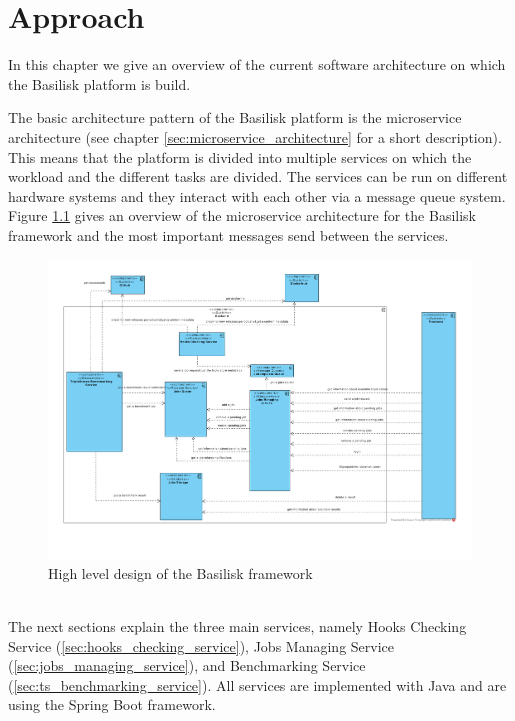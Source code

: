 \chapter{Approach}
\label{ch:approach}

In this chapter we give an overview of the current software architecture on which the Basilisk platform is build.

The basic architecture pattern of the Basilisk platform is the microservice architecture (see chapter \ref{sec:microservice_architecture} for a short description). 
This means that the platform is divided into multiple services on which the workload and the different tasks are divided.
The services can be run on different hardware systems and they interact with each other via a message queue system.
\\


Figure \ref{fig:basilisk_high_level_design} gives an overview of the microservice architecture for the Basilisk framework and the most important messages send between the services.
\begin{figure}[tbph]
	\centering
	\includegraphics[width=1.1\textwidth]{figures/basilisk_high_level_design.pdf}
	\caption{High level design of the Basilisk framework}
	\label{fig:basilisk_high_level_design}
\end{figure}
\\

The next sections explain the three main services, namely Hooks Checking Service (\ref{sec:hooks_checking_service}), Jobs Managing Service (\ref{sec:jobs_managing_service}), and \ts{} Benchmarking Service (\ref{sec:ts_benchmarking_service}).
All services are implemented with Java and are using the Spring Boot framework.


